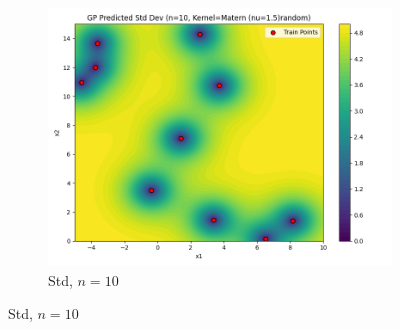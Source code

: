 \documentclass[a4paper,12pt]{article}
\begin{document}
\begin{figure}[H]
\begin{subfigure}{0.3\textwidth}
\end{subfigure}
\begin{subfigure}{0.3\textwidth}
    \includegraphics[width=\linewidth]{Task-02/images/gp_std_matern_n10_random.png}
    \caption{Std, $n=10$}
\end{subfigure}


\end{figure}
\end{document}
